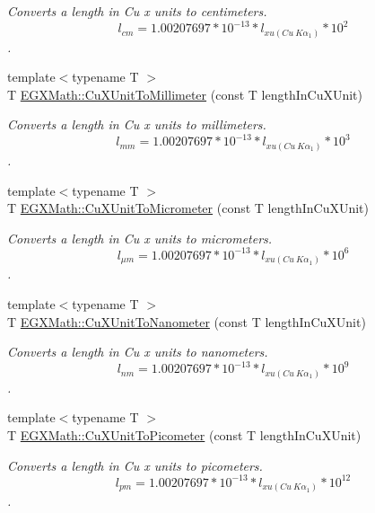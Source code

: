 \begin{DoxyCompactItemize}
\begin{DoxyCompactList}\small\item\em Converts a length in Cu x units to centimeters. \[ l_{cm}=1.00207697*10^{-13} * l_{xu(Cu\ K\alpha_1)} * 10^{2} \]. \end{DoxyCompactList}\item 
{\footnotesize template$<$typename T $>$ }\\T \mbox{\hyperlink{group___e_g_x_math-_conversions-_length_conversions-_non-_s_i-_cu_x_unit-_s_i_gabc336b44c0573fa86306811f1c5a15b9}{E\+G\+X\+Math\+::\+Cu\+X\+Unit\+To\+Millimeter}} (const T length\+In\+Cu\+X\+Unit)
\begin{DoxyCompactList}\small\item\em Converts a length in Cu x units to millimeters. \[ l_{mm}=1.00207697*10^{-13} * l_{xu(Cu\ K\alpha_1)} * 10^{3} \]. \end{DoxyCompactList}\item 
{\footnotesize template$<$typename T $>$ }\\T \mbox{\hyperlink{group___e_g_x_math-_conversions-_length_conversions-_non-_s_i-_cu_x_unit-_s_i_gaff5d323918d6135f9e7643a5c6a17414}{E\+G\+X\+Math\+::\+Cu\+X\+Unit\+To\+Micrometer}} (const T length\+In\+Cu\+X\+Unit)
\begin{DoxyCompactList}\small\item\em Converts a length in Cu x units to micrometers. \[ l_{\mu m}=1.00207697*10^{-13} * l_{xu(Cu\ K\alpha_1)} * 10^{6} \]. \end{DoxyCompactList}\item 
{\footnotesize template$<$typename T $>$ }\\T \mbox{\hyperlink{group___e_g_x_math-_conversions-_length_conversions-_non-_s_i-_cu_x_unit-_s_i_gac14b0200f069cb1ec0ba03540d93230a}{E\+G\+X\+Math\+::\+Cu\+X\+Unit\+To\+Nanometer}} (const T length\+In\+Cu\+X\+Unit)
\begin{DoxyCompactList}\small\item\em Converts a length in Cu x units to nanometers. \[ l_{nm}=1.00207697*10^{-13} * l_{xu(Cu\ K\alpha_1)} * 10^{9} \]. \end{DoxyCompactList}\item 
{\footnotesize template$<$typename T $>$ }\\T \mbox{\hyperlink{group___e_g_x_math-_conversions-_length_conversions-_non-_s_i-_cu_x_unit-_s_i_ga789ff4191ad452d5dc54f4bd3d267566}{E\+G\+X\+Math\+::\+Cu\+X\+Unit\+To\+Picometer}} (const T length\+In\+Cu\+X\+Unit)
\begin{DoxyCompactList}\small\item\em Converts a length in Cu x units to picometers. \[ l_{pm}=1.00207697*10^{-13} * l_{xu(Cu\ K\alpha_1)} * 10^{12} \]. \end{DoxyCompactList}\item 

\end{DoxyCompactItemize}
